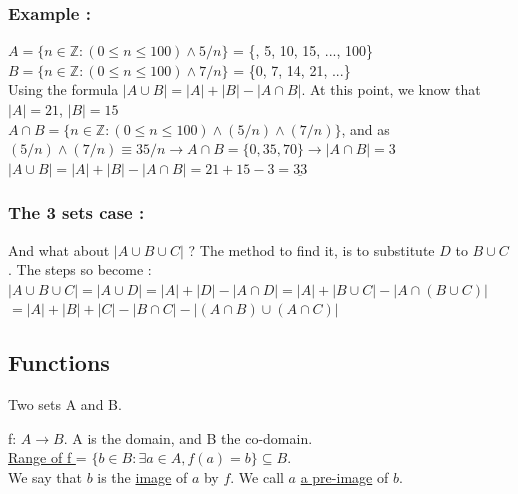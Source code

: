 \documentclass[12pt,a4paper]{article}
\begin{document}
\subsubsection{Example :}
$A = \{n \in \mathbb{Z} : (0 \leq n \leq 100) \wedge 5/n \}$ = \{, 5, 10, 15, ..., 100\}\\
$B = \{n \in \mathbb{Z} : (0 \leq n \leq 100) \wedge 7/n \}$ = \{0, 7, 14, 21, ...\}\\
Using the formula $|A \cup B| = |A| + |B| - |A\cap B|$. At this point, we know that $|A| = 21$, $|B| = 15$\\
$A \cap B = \{n \in \mathbb{Z} : (0 \leq n \leq 100) \wedge (5/n) \wedge (7/n) \}$, and as $(5/n) \wedge (7/n) \equiv 35/n \rightarrow A \cap B = \{ 0, 35, 70\} \rightarrow |A\cap B| = 3$\\
$|A \cup B| = |A| + |B| - |A\cap B| = 21 + 15 - 3 = \underline{33}$

\subsubsection{The 3 sets case :}
And what about $|A \cup B \cup C|$ ? The method to find it, is to substitute $D$ to $B \cup C$. The steps so become :\\
$|A \cup B \cup C| = |A \cup D| = |A| + |D| - |A \cap D| = |A| + |B \cup C| - |A \cap (B \cup C)|$\\
$=|A| + |B| + |C| -|B \cap C| - |(A \cap B) \cup (A \cap C)|$

\begin{center}
\end{center}

\newpage
\subsection{Functions }
Two sets A and B.
\begin{center}
\end{center}

f: $A \rightarrow B$. A is the domain, and B the co-domain.\\
\underline{Range of f } = $\{b \in B : \exists a \in A, f(a) = b\} \subseteq B$.\\
 We say that $b$ is the \underline{image} of $a$ by $f$. We call $a$ \underline{a pre-image} of $b$.
\end{document}
